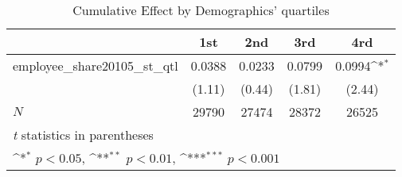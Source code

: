 \begin{table}[htbp]\centering
\def\sym#1{\ifmmode^{#1}\else\(^{#1}\)\fi}
\caption{Cumulative Effect by Demographics' quartiles}
\begin{tabular}{l*{4}{c}}
\hline\hline
            &\multicolumn{1}{c}{1st}&\multicolumn{1}{c}{2nd}&\multicolumn{1}{c}{3rd}&\multicolumn{1}{c}{4rd}\\
\hline
employee\_share20105\_st\_qtl&      0.0388         &      0.0233         &      0.0799         &      0.0994\sym{*}  \\
            &      (1.11)         &      (0.44)         &      (1.81)         &      (2.44)         \\
\hline
\(N\)       &       29790         &       27474         &       28372         &       26525         \\
\hline\hline
\multicolumn{5}{l}{\footnotesize \textit{t} statistics in parentheses}\\
\multicolumn{5}{l}{\footnotesize \sym{*} \(p<0.05\), \sym{**} \(p<0.01\), \sym{***} \(p<0.001\)}\\
\end{tabular}
\end{table}
